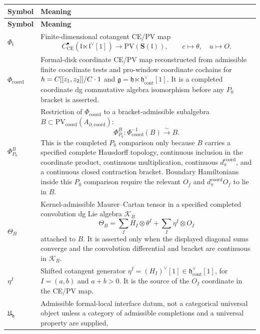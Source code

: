 \begin{longtable}{@{}>{\raggedright\arraybackslash}p{}
  >{\raggedright\arraybackslash}p{}@{}}
\hline
\textbf{Symbol} & \textbf{Meaning}\\
\hline
\endfirsthead
\hline
\textbf{Symbol} & \textbf{Meaning}\\
\hline
\endhead
\(\Phi_{\mathfrak l}\) &
Finite-dimensional cotangent CE/PV map
\[
  C^\bullet_{\mathrm{CE}}
  (\mathfrak l\ltimes \mathfrak l^\vee[1])
  \to \mathrm{PV}(\mathbf S(\mathfrak l)),
  \qquad c\mapsto\theta,\quad u\mapsto O .
\]\\
\hline
\(\Phi_{\mathrm{coord}}\) &
Formal-disk coordinate CE/PV map reconstructed from admissible finite
coordinate tests and pro-window coordinate cochains for
\(h=C[[z_1,z_2]]/C\cdot1\) and
\(\mathfrak g=\mathfrak h\ltimes
\mathfrak h^\vee_{\mathrm{cont}}[1]\).  It is a completed coordinate dg
commutative algebra isomorphism before any \(P_0\) bracket is asserted.\\
\hline
\(\Phi^B_{P_0}\) &
Restriction of \(\Phi_{\mathrm{coord}}\) to a bracket-admissible
subalgebra \(B\subset
\mathrm{PV}_{\mathrm{coord}}(A_{\partial,\mathrm{coord}})\):
\[
  \Phi^B_{P_0}\colon\Phi_{\mathrm{coord}}^{-1}(B)\xrightarrow{\sim}B .
\]
This is the completed \(P_0\) comparison only because \(B\) carries a
specified complete Hausdorff topology, continuous inclusion in the
coordinate product, continuous multiplication, continuous
\(d_\pi^{\mathrm{coord}}\), and a continuous closed contraction bracket.
Boundary Hamiltonians inside this \(P_0\) comparison require the relevant
\(O_f\) and \(d_\pi^{\mathrm{coord}}O_f\) to lie in \(B\).\\
\hline
\(\Theta_B\) &
Kernel-admissible Maurer--Cartan tensor in a specified completed
convolution dg Lie algebra \(\mathcal K_B\)
\[
  \Theta_B=\sum_I H_I\otimes\theta^I+\sum_I\eta^I\otimes O_I
\]
attached to \(B\).  It is asserted only when the displayed diagonal sums
converge and the convolution differential and bracket are continuous in
\(\mathcal K_B\).\\
\hline
\(\eta^I\) &
Shifted cotangent generator
\(\eta^I=(H_I)^\vee[1]\in\mathfrak h^\vee_{\mathrm{cont}}[1]\), for
\(I=(a,b)\) and \(a+b>0\).  It is the source of the \(O_I\) coordinate in
the CE/PV map.\\
\hline
\(\mathfrak U_{\mathfrak h}\) &
Admissible formal-local interface datum, not a categorical universal
object unless a category of admissible completions and a universal
property are supplied,

\end{longtable}
